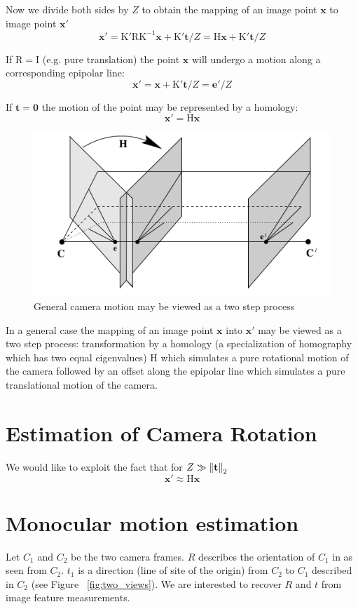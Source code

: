 \documentclass[10pt]{article}         %
\DeclarePairedDelimiter\norm{\lVert}{\rVert}%
\begin{document}
Now we divide both sides by $Z$ to obtain the mapping of an image point $\mathbf{x}$ to image point $\mathbf{x}'$
\[
\mathbf{x}' = \mathrm{K'RK^{-1}}\mathbf{x} + \mathrm{K'}\mathbf{t}/Z = \mathrm{H}\mathbf{x}+ \mathrm{K'}\mathbf{t}/Z
\]

If $\mathrm{R = I}$ (e.g. pure translation) the point $\mathbf{x}$ will undergo a motion along a corresponding epipolar line:
\[
\mathbf{x}' = \mathbf{x}+ \mathrm{K'}\mathbf{t}/Z = \mathbf{e}'/Z
\]

If $\mathbf{t} = \mathbf{0}$ the motion of the point may be represented by a homology:
\[
\mathbf{x}' = \mathrm{H}\mathbf{x}
\]

\begin{figure}[h]
\includegraphics[scale=.5]{general_camera_motion}
\centering
\caption{General camera motion may be viewed as a two step process}
\end{figure}

In a general case the mapping of an image point $\mathbf{x}$ into $\mathbf{x}'$ may be viewed as a two step process: transformation by a homology (a specialization of homography which has two equal eigenvalues) $\mathrm{H}$ which simulates a pure rotational motion of the camera followed by an offset along the epipolar line which simulates a pure translational motion of the camera.

\section{Estimation of Camera Rotation}
We would like to exploit the fact that for $Z \gg \mathbf{\norm{t}}_2$
\[
\mathbf{x}' \approx \mathrm{H}\mathbf{x}
\]
\section{Monocular motion estimation}\label{sec:mono_odo}
Let $C_1$ and $C_2$ be the two camera frames.  $R$ describes the
orientation of $C_1$ in as seen from $C_2$. $t_1$ is a direction (line
of site of the origin) from $C_2$ to $C_1$ described in $C_2$ (see
Figure ~\ref{fig:two_views}).  We are interested to recover $R$ and
$t$ from image feature measurements.
\end{document}
